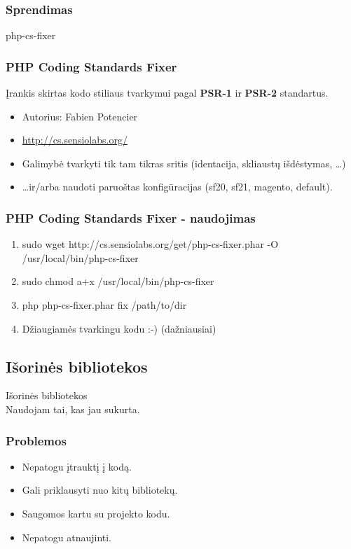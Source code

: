 \documentclass[12pt,a4paper]{beamer}
\begin{document}
\begin{frame}[fragile]
    \frametitle{Sprendimas}

    {\Huge php-cs-fixer}
\end{frame}

\begin{frame}
    \frametitle{PHP Coding Standards Fixer}
    Įrankis skirtas kodo stiliaus tvarkymui pagal \textbf{PSR-1} ir \textbf{PSR-2} standartus.
    \begin{itemize}
        \item Autorius: Fabien Potencier
        \item \url{http://cs.sensiolabs.org/}
        \item Galimybė tvarkyti tik tam tikras sritis (identacija, skliaustų išdėstymas, \dots)
        \item \dots ir/arba naudoti paruoštas konfigūracijas (sf20, sf21, magento, default).
    \end{itemize}
\end{frame}

\begin{frame}
    \frametitle{PHP Coding Standards Fixer - naudojimas}
    {\small
        \begin{enumerate}
            \item {\color{orange}sudo wget http://cs.sensiolabs.org/get/php-cs-fixer.phar -O /usr/local/bin/php-cs-fixer}
            \item {\color{orange}sudo chmod a+x /usr/local/bin/php-cs-fixer}
            \item {\color{orange}php php-cs-fixer.phar fix /path/to/dir}
            \item Džiaugiamės tvarkingu kodu :-) \pause(dažniausiai)
        \end{enumerate}
    }
\end{frame}

\subsection{Išorinės bibliotekos}
\begin{frame}[fragile]

    {\Huge Išorinės bibliotekos}\\
    Naudojam tai, kas jau sukurta.
\end{frame}

\begin{frame}
    \frametitle{Problemos}
    \begin{itemize}
        \item Nepatogu įtrauktį į kodą.
        \item Gali priklausyti nuo kitų bibliotekų.
        \item Saugomos kartu su projekto kodu.
        \item Nepatogu atnaujinti.
    \end{itemize}
\end{frame}
\end{document}
